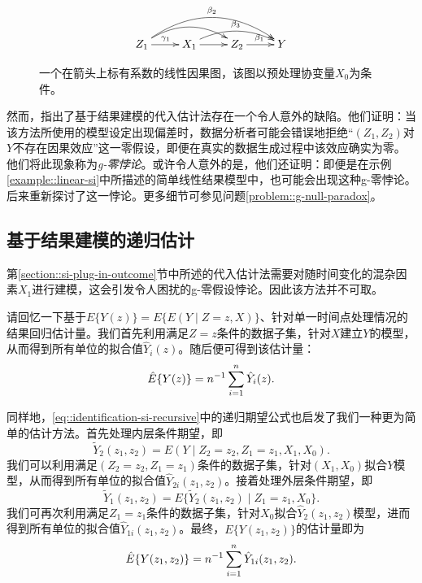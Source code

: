 \begin{figure}[t]
\bigskip 
$$
 \xymatrix{
 Z_1 \ar[r]^{\gamma_1}   \ar@/^1.3pc/[rr]  \ar@/^2.0pc/[rrr]^{\beta_2} & X_1  \ar@/^1pc/[rr]^{\beta_3}  \ar[r] & Z_2  \ar[r]^{\beta_1} & Y
 }
 $$
 \caption{ 一个在箭头上标有系数的线性因果图，该图以预处理协变量$X_0$为条件。}\label{fig::si-simple-coefficients}
\end{figure}
 
 
 


然而，\citet{robinswasserman1997estimation}指出了基于结果建模的代入估计法存在一个令人意外的缺陷。他们证明：当该方法所使用的模型设定出现偏差时，数据分析者可能会错误地拒绝“$(Z_1,Z_2)$对$Y$不存在因果效应”这一零假设，即便在真实的数据生成过程中该效应确实为零。他们将此现象称为{\it g-零悖论}。或许令人意外的是，他们还证明：即便是在示例\ref{example::linear-si}中所描述的简单线性结果模型中，也可能会出现这种g-零悖论。\citet{mcgrath2021revisiting}后来重新探讨了这一悖论。更多细节可参见问题\ref{problem::g-null-paradox}。 

 

\subsection{基于结果建模的递归估计}
\label{section::recursive}

第\ref{section::si-plug-in-outcome}节中所述的代入估计法需要对随时间变化的混杂因素$X_1$进行建模，这会引发令人困扰的g-零假设悖论。因此该方法并不可取。 

请回忆一下基于$E\{  Y(z)  \} = E\{  E(Y\mid Z=z, X) \}$、针对单一时间点处理情况的结果回归估计量。我们首先利用满足$Z=z$条件的数据子集，针对$X$建立$Y$的模型，从而得到所有单位的拟合值$\hat{Y}_i(z)$。随后便可得到该估计量：
$$
\hat E\{  Y(z)  \}  = n^{-1} \sum_{i=1}^n \hat{Y}_i(z).
$$

同样地，\eqref{eq::identification-si-recursive}中的递归期望公式也启发了我们一种更为简单的估计方法。首先处理内层条件期望，即$$
\tilde Y_2(z_1, z_2) = E(Y\mid Z_2 = z_2,Z_1 = z_1, X_1,  X_0).
$$我们可以利用满足$(Z_2 = z_2, Z_1 = z_1)$条件的数据子集，针对$(X_1,X_0)$拟合$Y$模型，从而得到所有单位的拟合值$\hat{Y}_{2i}(z_1, z_2) $。接着处理外层条件期望，即$$
\tilde{Y}_1(z_1, z_2)  =  E\{  \tilde{Y}_2(z_1, z_2)  \mid Z_1=z_1, X_0 \}. 
$$我们可再次利用满足$Z_1=z_1$条件的数据子集，针对$X_0$拟合$\hat{Y}_2(z_1, z_2) $模型，进而得到所有单位的拟合值$\hat{Y}_{1i}(z_1, z_2) $。最终，$E\{ Y(z_1, z_2) \} $的估计量即为$$
\hat E\{ Y(z_1, z_2) \}  = n^{-1} \sum_{i=1}^n \hat{Y}_{1i}(z_1, z_2) .
$$

